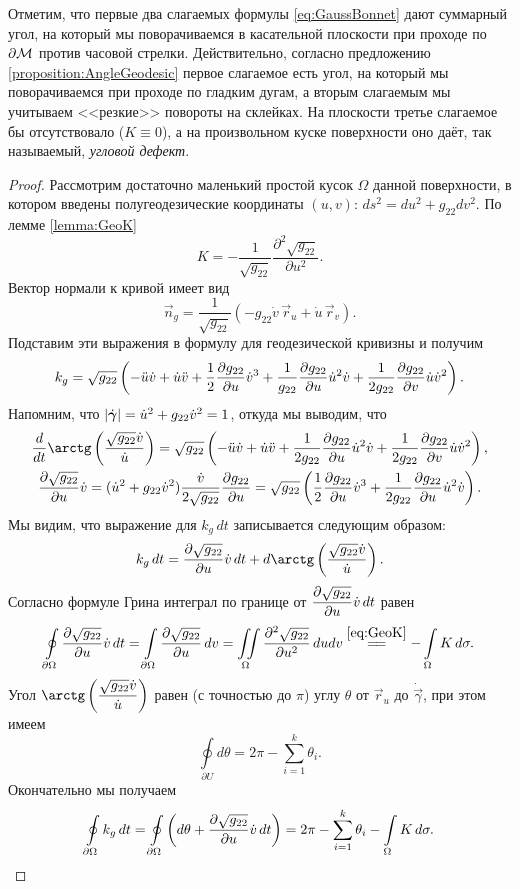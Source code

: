 Отметим, что первые два слагаемых формулы \eqref{eq:GaussBonnet} дают суммарный угол, на который мы поворачиваемся в касательной плоскости при проходе по $\partial \mathcal{M}$ против часовой стрелки. Действительно, согласно предложению \ref{proposition:AngleGeodesic} первое слагаемое есть угол, на который мы поворачиваемся при проходе по гладким дугам, а вторым слагаемым мы учитываем <<резкие>> повороты на склейках. На плоскости третье слагаемое бы отсутствовало ($K \equiv 0$), а на произвольном куске поверхности оно даёт, так называемый, \textit{угловой дефект}.

\begin{proof}
	Рассмотрим достаточно маленький простой кусок $\Omega$ данной поверхности, в котором введены полугеодезические координаты $(u, v)$: $ds^2 = du^2 + g_{22}dv^2$. По лемме \ref{lemma:GeoK}
	\[
		K = -\frac{1}{\sqrt{g_{22}}}\frac{\partial^2\sqrt{g_{22}}}{\partial u^2}.
	\]
	Вектор нормали к кривой имеет вид
	\[
		\vec{n}_g = \frac{1}{\sqrt{g_{22}}}(-g_{22}\dot{v}\,\vec{r}_u + \dot{u}\,\vec{r}_v).
	\]
	Подставим эти выражения в формулу для геодезической кривизны и получим
	\[
		k_g = \sqrt{g_{22}}\left(-\ddot{u}\dot{v} + \dot{u}\ddot{v} + \frac{1}{2}\frac{\partial g_{22}}{\partial u}\dot{v}^3 + \frac{1}{g_{22}}\frac{\partial g_{22}}{\partial u}\dot{u}^2\dot{v} + \frac{1}{2g_{22}}\frac{\partial g_{22}}{\partial v}\dot{u}\dot{v}^2\right).
	\]
	Напомним, что $\left\lvert\dot{\boldsymbol{\gamma}}\right\rvert = \dot{u}^2 + g_{22}\dot{v}^2 = 1$, откуда мы выводим, что
	\begin{gather*}
		\frac{d}{dt}\arctg\br{\frac{\sqrt{g_{22}}\dot{v}}{\dot{u}}} = \sqrt{g_{22}}\br{-\ddot{u}\dot{v} + \dot{u}\ddot{v} + \frac{1}{2g_{22}}\frac{\partial g_{22}}{\partial u}\dot{u}^2\dot{v} + \frac{1}{2g_{22}}\frac{\partial g_{22}}{\partial v}\dot{u}\dot{v}^2},\\
		\frac{\partial\sqrt{g_{22}}}{\partial u}\dot{v} = (\dot{u}^2 + g_{22}\dot{v}^2)\frac{\dot{v}}{2\sqrt{g_{22}}}\frac{\partial g_{22}}{\partial u} = \sqrt{g_{22}}\br{\frac{1}{2}\frac{\partial g_{22}}{\partial u}\dot{v}^3 + \frac{1}{2g_{22}}\frac{\partial g_{22}}{\partial u}\dot{u}^2\dot{v}}.
	\end{gather*}
	Мы видим, что выражение для $k_g\,dt$ записывается следующим образом:
	\[
		k_g\,dt = \frac{\partial\sqrt{g_{22}}}{\partial u}\dot{v}\,dt + d\arctg\br{\frac{\sqrt{g_{22}}\dot{v}}{\dot{u}}}.
	\]
	Согласно формуле Грина интеграл по границе от $\displaystyle\frac{\partial\sqrt{g_{22}}}{\partial u}\dot{v}\,dt$ равен
	\[
		\oint\limits_{\partial \Omega}\frac{\partial\sqrt{g_{22}}}{\partial u}\dot{v}\,dt = \int\limits_{\partial \Omega}\frac{\partial\sqrt{g_{22}}}{\partial u}\,dv = \iint\limits_{\Omega}\frac{\partial^2\sqrt{g_{22}}}{\partial u^2}\,dudv \stackrel{\eqref{eq:GeoK}}{=\joinrel=} -\int\limits_{\Omega}K\,d\sigma.
	\]
	Угол $\ds\arctg\br{\frac{\sqrt{g_{22}}\dot{v}}{\dot{u}}}$ равен (с точностью до $\pi$) углу $\theta$ от $\vec{r}_u$ до $\dot{\vec{\gamma}}$, при этом имеем
	\[
		\oint\limits_{\partial U}d\theta = 2\pi - \sum_{i = 1}^k\theta_i.
	\]
	Окончательно мы получаем
	\[
		\oint\limits_{\partial \Omega}k_g\,dt = \oint\limits_{\partial \Omega}\left(d\theta + \frac{\partial\sqrt{g_{22}}}{\partial u}\dot{v}\,dt\right) = 2\pi - \sum_{i = 1}^k\theta_i - \int\limits_{\Omega}K\,d\sigma.
	\]
	

\end{proof}
